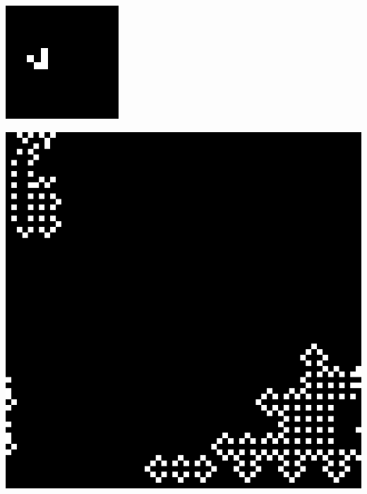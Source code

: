 \documentclass[11pt, oneside]{article}
\newenvironment{Figure}
  {\par\medskip\noindent\minipage{\linewidth}}
  {\endminipage\par\medskip}
\begin{document}
\begin{multicols}{3}

\begin{Figure}
\includegraphics[width=\linewidth]{images/16x16_2_1.png}
\end{Figure}

\begin{Figure}
\includegraphics[width=\linewidth]{images/64x64_2_1.png}
\end{Figure}



\end{multicols}
\end{document}
